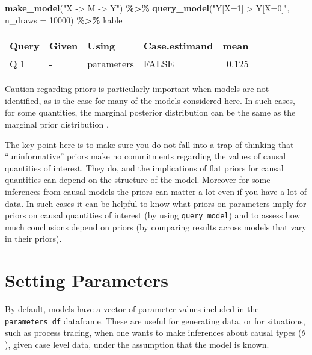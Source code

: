 \documentclass[
  12pt,
]{book}
\newenvironment{Shaded}{\begin{snugshade}}{\end{snugshade}}
\newcommand{\AttributeTok}[1]{\textcolor[rgb]{0.13,0.29,0.53}{#1}}
\newcommand{\DecValTok}[1]{\textcolor[rgb]{0.00,0.00,0.81}{#1}}
\newcommand{\FunctionTok}[1]{\textcolor[rgb]{0.13,0.29,0.53}{\textbf{#1}}}
\newcommand{\NormalTok}[1]{#1}
\newcommand{\SpecialCharTok}[1]{\textcolor[rgb]{0.81,0.36,0.00}{\textbf{#1}}}
\newcommand{\StringTok}[1]{\textcolor[rgb]{0.31,0.60,0.02}{#1}}
\begin{document}
\begin{Shaded}
\begin{Highlighting}[]
\FunctionTok{make\_model}\NormalTok{(}\StringTok{"X {-}\textgreater{} M {-}\textgreater{} Y"}\NormalTok{) }\SpecialCharTok{\%\textgreater{}\%}
  \FunctionTok{query\_model}\NormalTok{(}\StringTok{"Y[X=1] \textgreater{} Y[X=0]"}\NormalTok{, }\AttributeTok{n\_draws =} \DecValTok{10000}\NormalTok{) }\SpecialCharTok{\%\textgreater{}\%}
\NormalTok{  kable}
\end{Highlighting}
\end{Shaded}

\begin{tabular}{l|l|l|l|r}
\hline
Query & Given & Using & Case.estimand & mean\\
\hline
Q 1 & - & parameters & FALSE & 0.125\\
\hline
\end{tabular}

Caution regarding priors is particularly important when models are not identified, as is the case for many of the models considered here. In such cases, for some quantities, the marginal posterior distribution can be the same as the marginal prior distribution \citep{poirier1998revising}.

The key point here is to make sure you do not fall into a trap of thinking that ``uninformative'' priors make no commitments regarding the values of causal quantities of interest. They do, and the implications of flat priors for causal quantities can depend on the structure of the model. Moreover for some inferences from causal models the priors can matter a lot even if you have a lot of data. In such cases it can be helpful to know what priors on parameters imply for priors on causal quantities of interest (by using \texttt{query\_model}) and to assess how much conclusions depend on priors (by comparing results across models that vary in their priors).

\hypertarget{parameters}{%
\section{Setting Parameters}\label{parameters}}

By default, models have a vector of parameter values included in the \texttt{parameters\_df} dataframe. These are useful for generating data, or for situations, such as process tracing, when one wants to make inferences about causal types (\(\theta\)), given case level data, under the assumption that the model is known.
\end{document}
